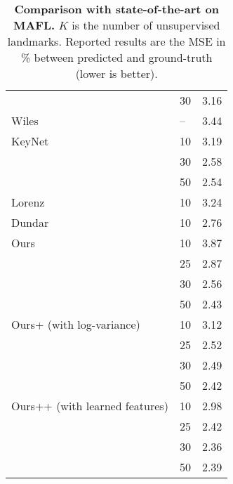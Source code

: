 \documentclass[nohyperref]{article}
\theoremstyle{plain}
\theoremstyle{definition}
\theoremstyle{remark}
\begin{document}
\begin{table}
\begin{tabular}{@{}llc@{}}
                                           & 30   & 3.16                           \\
    Wiles~\citep{wiles2018self}              & {--} & 3.44                           \\ 
    KeyNet~\citep{jakab2018unsupervised}   & 10 &   3.19                            \\
                                            & 30 & 2.58                             \\
                                            & 50 & 2.54                             \\ 
    Lorenz~\citep{lorenz2019unsupervised}   & 10 &   3.24                            \\
    Dundar~\citep{dundar2021unsupervised}   & 10 &   2.76                      \\ \midrule
    Ours                                    & 10   & 3.87                         \\
                                            & 25   & 2.87                            \\
                                            & 30   & 2.56                            \\
                                            & 50   & 2.43                          \\ \midrule
    Ours+ (with log-variance)                   & 10   & 3.12                         \\
                                            & 25   & 2.52                            \\
                                            & 30   & 2.49                            \\
                                            & 50   & 2.42                          \\ \midrule
    Ours++ (with learned features)          & 10   & 2.98                         \\
                                            & 25   & 2.42                            \\
                                            & 30   & 2.36                            \\
                                            & 50   & 2.39                         \\ \bottomrule
    \end{tabular}
    \caption{{\bf Comparison with state-of-the-art on MAFL.} $K$ is the number of unsupervised landmarks. Reported results are the MSE in \% between predicted and ground-truth (lower is better).}
    \label{tab_apndx:face-sota}
\end{table}
\end{document}
